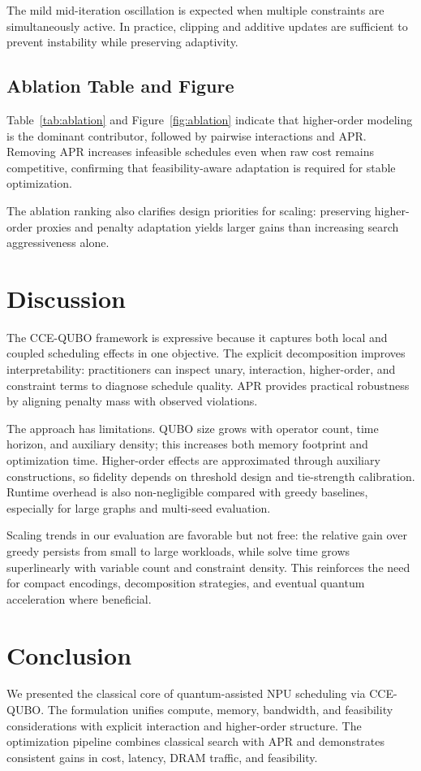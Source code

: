 \documentclass{article}
\begin{document}
The mild mid-iteration oscillation is expected when multiple constraints are simultaneously active. In practice, clipping and additive updates are sufficient to prevent instability while preserving adaptivity.

\subsection{Ablation Table and Figure}
Table~\ref{tab:ablation} and Figure~\ref{fig:ablation} indicate that higher-order modeling is the dominant contributor, followed by pairwise interactions and APR. Removing APR increases infeasible schedules even when raw cost remains competitive, confirming that feasibility-aware adaptation is required for stable optimization.

The ablation ranking also clarifies design priorities for scaling: preserving higher-order proxies and penalty adaptation yields larger gains than increasing search aggressiveness alone.

\section{Discussion}
The CCE-QUBO framework is expressive because it captures both local and coupled scheduling effects in one objective. The explicit decomposition improves interpretability: practitioners can inspect unary, interaction, higher-order, and constraint terms to diagnose schedule quality. APR provides practical robustness by aligning penalty mass with observed violations.

The approach has limitations. QUBO size grows with operator count, time horizon, and auxiliary density; this increases both memory footprint and optimization time. Higher-order effects are approximated through auxiliary constructions, so fidelity depends on threshold design and tie-strength calibration. Runtime overhead is also non-negligible compared with greedy baselines, especially for large graphs and multi-seed evaluation.

Scaling trends in our evaluation are favorable but not free: the relative gain over greedy persists from small to large workloads, while solve time grows superlinearly with variable count and constraint density. This reinforces the need for compact encodings, decomposition strategies, and eventual quantum acceleration where beneficial.

\section{Conclusion}
We presented the classical core of quantum-assisted NPU scheduling via CCE-QUBO. The formulation unifies compute, memory, bandwidth, and feasibility considerations with explicit interaction and higher-order structure. The optimization pipeline combines classical search with APR and demonstrates consistent gains in cost, latency, DRAM traffic, and feasibility.
\end{document}
